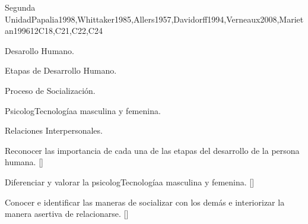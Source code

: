\begin{syllabus}
\begin{unit}{}{Segunda Unidad}{Papalia1998,Whittaker1985,Allers1957,Davidorff1994,Verneaux2008,Marietan1996}{12}{C18,C21,C22,C24}
\begin{topics}
	\item Desarollo Humano.
	    \begin{subtopics}
		\item Etapas de Desarrollo Humano.
	    \end{subtopics}
	\item Proceso de Socialización.
	    \begin{subtopics}
		\item PsicologTecnologíaa masculina y femenina.
		\item Relaciones Interpersonales.
	    \end{subtopics}
\end{topics}
\begin{learningoutcomes}
	\item Reconocer las importancia de cada una de las etapas del desarrollo de la persona humana. [\Familiarity]
	\item Diferenciar y valorar la psicologTecnologíaa masculina y femenina. [\Familiarity]
	\item Conocer e identificar las maneras de socializar con los demás e interiorizar la manera asertiva de relacionarse. [\Familiarity]
\end{learningoutcomes}
\end{unit}


\end{syllabus}
